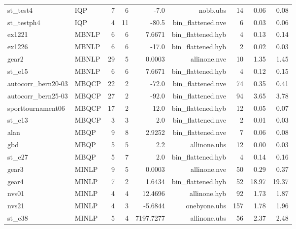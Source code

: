 \documentclass[a4paper,landscape]{article}
\begin{document}
\begin{center}
\begin{tabular}{|l|l|r|r|r|r|r|r|r|}
st\_test4 & IQP & 7 & 6 & -7.0 & nobb.ubs & 14 & 0.06 & 0.08 \\
st\_testph4 & IQP & 4 & 11 & -80.5 & bin\_flattened.nve & 6 & 0.03 & 0.06 \\
ex1221 & MBNLP & 6 & 6 & 7.6671 & bin\_flattened.hyb & 4 & 0.13 & 0.14 \\
ex1226 & MBNLP & 6 & 6 & -17.0 & bin\_flattened.hyb & 2 & 0.02 & 0.03 \\
gear2 & MBNLP & 29 & 5 & 0.0003 & allinone.nve & 10 & 1.35 & 1.45 \\
st\_e15 & MBNLP & 6 & 6 & 7.6671 & bin\_flattened.hyb & 4 & 0.12 & 0.15 \\
autocorr\_bern20-03 & MBQCP & 22 & 2 & -72.0 & bin\_flattened.nve & 74 & 0.35 & 0.41 \\
autocorr\_bern25-03 & MBQCP & 27 & 2 & -92.0 & bin\_flattened.nve & 94 & 3.65 & 3.78 \\
sporttournament06 & MBQCP & 17 & 2 & 12.0 & bin\_flattened.hyb & 12 & 0.05 & 0.07 \\
st\_e13 & MBQCP & 3 & 3 & 2.0 & bin\_flattened.nve & 2 & 0.01 & 0.03 \\
alan & MBQP & 9 & 8 & 2.9252 & bin\_flattened.nve & 7 & 0.06 & 0.08 \\
gbd & MBQP & 5 & 5 & 2.2 & allinone.ubs & 12 & 0.00 & 0.03 \\
st\_e27 & MBQP & 5 & 7 & 2.0 & bin\_flattened.hyb & 4 & 0.14 & 0.16 \\
gear3 & MINLP & 9 & 5 & 0.0003 & allinone.nve & 50 & 0.29 & 0.37 \\
gear4 & MINLP & 7 & 2 & 1.6434 & bin\_flattened.hyb & 52 & 18.97 & 19.37 \\
nvs01 & MINLP & 4 & 4 & 12.4696 & allinone.hyb & 92 & 1.73 & 1.87 \\
nvs21 & MINLP & 4 & 3 & -5.6844 & onebyone.ubs & 157 & 1.78 & 1.96 \\
st\_e38 & MINLP & 5 & 4 & 7197.7277 & allinone.ubs & 56 & 2.37 & 2.48 \\
\hline  \end{tabular}
\end{center}
\newpage
\end{document}
